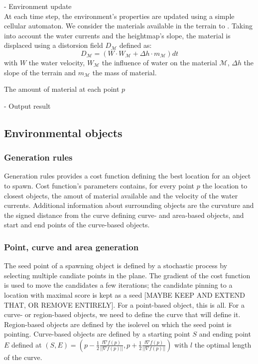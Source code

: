\documentclass{egpubl}
\newcommand{\material}{\mathcal{M}}
\begin{document}
- Environment update \\
At each time step, the environment's properties are updated using a simple cellular automaton. We consider the materials available in the terrain to . Taking into account the water currents and the heightmap's slope, the material is displaced using a distorsion field $D_\material$ defined as:
$$
D_\material = \left( W \cdot W_\material + \Delta h \cdot m_\material \right) dt
$$
with $W$ the water velocity, $W_\material$ the influence of water on the material $\material$, $\Delta h$ the slope of the terrain and $m_\material$ the mass of material.

The amount of material at each point $p$ 

- Output result


\subsection{Environmental objects}
\subsubsection{Generation rules}
Generation rules provides a cost function defining the best location for an object to spawn. Cost function's parameters contains, for every point $p$ the location to closest objects, the amout of material available and the velocity of the water currents. 
Additional information about surrounding objects are the curvature and the signed distance from the curve defining curve- and area-based objects, and start and end points of the curve-based objects.

\subsubsection{Point, curve and area generation}
The seed point of a spawning object is defined by a stochastic process by selecting multiple candiate points in the plane. The gradient of the cost function is used to move the candidates a few iterations; the candidate pinning to a location with maximal score is kept as a seed [MAYBE KEEP AND EXTEND THAT, OR REMOVE ENTIRELY]. For a point-based object, this is all. For a curve- or region-based objects, we need to define the curve that will define it. 
Region-based objects are defined by the isolevel on which the seed point is pointing.
Curve-based objects are defined by a starting point $S$ and ending point $E$ defined at $(S, E) = \left(p - \frac{1}{2}\frac{l \nabla f(p)}{||\nabla f(p)||}, p + \frac{1}{2}\frac{l \nabla f(p)}{||\nabla f(p)||} \right)$  with $l$ the optimal length of the curve.
\end{document}
